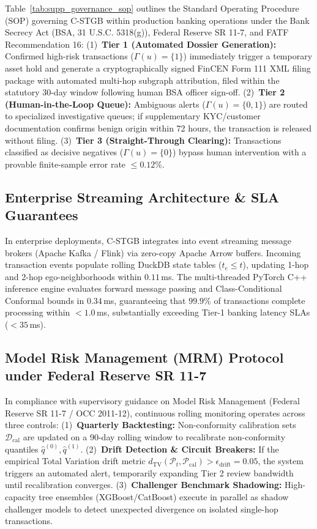 \documentclass[a4paper,fleqn,twocolumn]{article}
\begin{document}
Table~\ref{tab:supp_governance_sop} outlines the Standard Operating Procedure (SOP) governing C-STGB within production banking operations under the Bank Secrecy Act (BSA, 31 U.S.C. 5318(g)), Federal Reserve SR 11-7, and FATF Recommendation 16: (1)~\textbf{Tier 1 (Automated Dossier Generation):} Confirmed high-risk transactions ($\Gamma(u) = \{1\}$) immediately trigger a temporary asset hold and generate a cryptographically signed FinCEN Form 111 XML filing package with automated multi-hop subgraph attribution, filed within the statutory 30-day window following human BSA officer sign-off. (2)~\textbf{Tier 2 (Human-in-the-Loop Queue):} Ambiguous alerts ($\Gamma(u) = \{0, 1\}$) are routed to specialized investigative queues; if supplementary KYC/customer documentation confirms benign origin within 72 hours, the transaction is released without filing. (3)~\textbf{Tier 3 (Straight-Through Clearing):} Transactions classified as decisive negatives ($\Gamma(u) = \{0\}$) bypass human intervention with a provable finite-sample error rate $\le 0.12\%$.

\subsection{Enterprise Streaming Architecture \& SLA Guarantees}
In enterprise deployments, C-STGB integrates into event streaming message brokers (Apache Kafka / Flink) via zero-copy Apache Arrow buffers. Incoming transaction events populate rolling DuckDB state tables ($t_e \le t$), updating 1-hop and 2-hop ego-neighborhoods within $0.11$\,ms. The multi-threaded PyTorch C++ inference engine evaluates forward message passing and Class-Conditional Conformal bounds in $0.34$\,ms, guaranteeing that $99.9\%$ of transactions complete processing within $<1.0$\,ms, substantially exceeding Tier-1 banking latency SLAs ($< 35$\,ms).

\subsection{Model Risk Management (MRM) Protocol under Federal Reserve SR 11-7}
In compliance with supervisory guidance on Model Risk Management (Federal Reserve SR 11-7 / OCC 2011-12), continuous rolling monitoring operates across three controls: (1)~\textbf{Quarterly Backtesting:} Non-conformity calibration sets $\mathcal{D}_{\text{cal}}$ are updated on a 90-day rolling window to recalibrate non-conformity quantiles $\hat{q}^{(0)}, \hat{q}^{(1)}$. (2)~\textbf{Drift Detection \& Circuit Breakers:} If the empirical Total Variation drift metric $d_{\text{TV}}(\mathcal{P}_t, \mathcal{P}_{\text{cal}}) > \epsilon_{\text{drift}} = 0.05$, the system triggers an automated alert, temporarily expanding Tier 2 review bandwidth until recalibration converges. (3)~\textbf{Challenger Benchmark Shadowing:} High-capacity tree ensembles (XGBoost/CatBoost) execute in parallel as shadow challenger models to detect unexpected divergence on isolated single-hop transactions.
\end{document}
